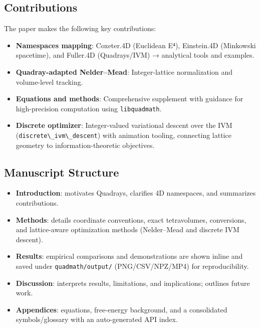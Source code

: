 \documentclass[
  10pt,
]{article}
\newcommand{\passthrough}[1]{#1}
\providecommand{\tightlist}{%
  \setlength{\itemsep}{0pt}\setlength{\parskip}{0pt}}
\begin{document}
\subsection{Contributions}\label{contributions}

The paper makes the following key contributions:

\begin{itemize}
\tightlist
\item
  \textbf{Namespaces mapping}: Coxeter.4D (Euclidean E⁴), Einstein.4D
  (Minkowski spacetime), and Fuller.4D (Quadrays/IVM) → analytical tools
  and examples.
\item
  \textbf{Quadray-adapted Nelder--Mead}: Integer-lattice normalization
  and volume-level tracking.
\item
  \textbf{Equations and methods}: Comprehensive supplement with guidance
  for high-precision computation using
  \passthrough{\lstinline!libquadmath!}.
\item
  \textbf{Discrete optimizer}: Integer-valued variational descent over
  the IVM (\passthrough{\lstinline!discrete\_ivm\_descent!}) with
  animation tooling, connecting lattice geometry to
  information-theoretic objectives.
\end{itemize}

\subsection{Manuscript Structure}\label{manuscript-structure}

\begin{itemize}
\tightlist
\item
  \textbf{Introduction}: motivates Quadrays, clarifies 4D namespaces,
  and summarizes contributions.
\item
  \textbf{Methods}: details coordinate conventions, exact tetravolumes,
  conversions, and lattice-aware optimization methods (Nelder--Mead and
  discrete IVM descent).
\item
  \textbf{Results}: empirical comparisons and demonstrations are shown
  inline and saved under \passthrough{\lstinline!quadmath/output/!}
  (PNG/CSV/NPZ/MP4) for reproducibility.
\item
  \textbf{Discussion}: interprets results, limitations, and
  implications; outlines future work.
\item
  \textbf{Appendices}: equations, free-energy background, and a
  consolidated symbols/glossary with an auto-generated API index.
\end{itemize}
\end{document}
